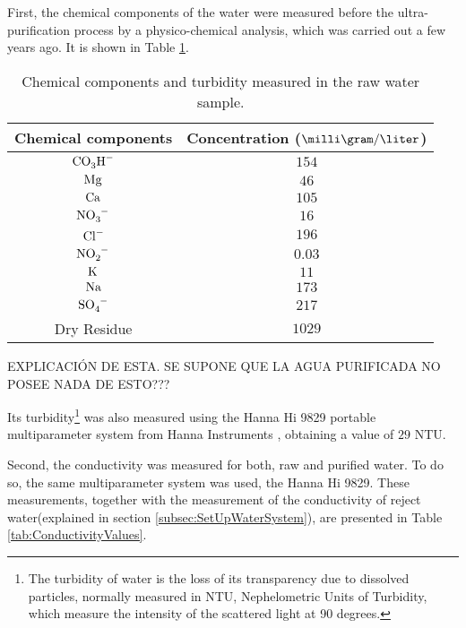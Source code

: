 First, the chemical components of the water were measured before the ultra-purification process by a physico-chemical analysis, which was carried out a few years ago. It is shown in Table \ref{tab:ChemicalComponentsRawWater}.

\begin{table}[htbp]
\begin{center}
\begin{tabular}{|c|c|}
\hline
Chemical components & Concentration ($\milli\gram/\liter$)\\
\hline \hline \hline
$\ce{CO_{3}H^-}$ & $154$ \\ \hline
$\ce{Mg}$ & $46$ \\ \hline
$\ce{Ca}$ & $105$ \\ \hline
$\ce{NO_{3}^-}$ & $16$ \\ \hline
$\ce{Cl^-}$ & $196$ \\ \hline
$\ce{NO_{2}^-}$ & $0.03$ \\ \hline
$\ce{K}$ & $11$ \\ \hline
$\ce{Na}$ & $173$ \\ \hline
$\ce{SO_{4}^-}$ & $217$ \\ \hline
Dry Residue & $1029$ \\ \hline
\end{tabular}
\caption{Chemical components and turbidity measured in the raw water sample.}
\label{tab:ChemicalComponentsRawWater}
\end{center}
\end{table}

EXPLICACIÓN DE ESTA. SE SUPONE QUE LA AGUA PURIFICADA NO POSEE NADA DE ESTO???

Its turbidity\footnote{The turbidity of water is the loss of its transparency due to dissolved particles, normally measured in NTU, Nephelometric Units of Turbidity, which measure the intensity of the scattered light at 90 degrees.} was also measured using the Hanna Hi 9829 portable multiparameter system from Hanna Instruments \cite{TurbiditySystem}, obtaining a value of $29$ NTU.

Second, the conductivity was measured for both, raw and purified water. To do so, the same multiparameter system was used, the Hanna Hi 9829. These measurements, together with the measurement of the conductivity of reject water(explained in section \ref{subsec:SetUpWaterSystem}), are presented in Table \ref{tab:ConductivityValues}.

